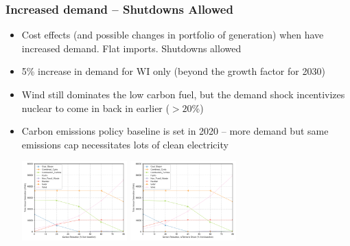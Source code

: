 \documentclass[xcolor=dvipsnames]{beamer}
\begin{document}
\begin{frame}
  \frametitle{Increased demand -- Shutdowns Allowed}

\begin{itemize}
  \item Cost effects (and possible changes in portfolio of generation) when
have increased demand.  Flat imports. Shutdowns allowed
  \item 5\% increase in demand for WI only (beyond the growth factor for 2030)
  \item Wind still dominates the low carbon fuel, but the demand shock incentivizes nuclear to come in back in earlier ($>20$\%)
  \item Carbon emissions policy baseline is set in 2020 -- more demand but same emissions cap necessitates lots of clean electricity

  \includegraphics[width=0.32\textwidth]{includes/no_leakage_shutdowns_agg_generation_cntlreg.png}
  \includegraphics[width=0.32\textwidth]{includes/no_leakage_demand_shock_agg_generation_cntlreg.png}

%
%

\end{itemize}

\end{frame}


%
%
%
\end{document}
